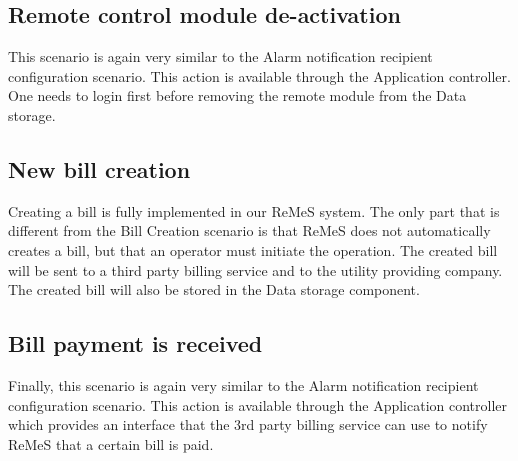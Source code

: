 \subsection{Remote control module de-activation}
This scenario is again very similar to the Alarm notification recipient configuration scenario. This action is available through the
Application controller. One needs to login first before removing the remote module from the Data storage.
\subsection{New bill creation}
Creating a bill is fully implemented in our ReMeS system. The only part that is different from the Bill Creation scenario is that ReMeS does
not automatically creates a bill, but that an operator must initiate the operation. The created bill will be sent to a third party billing
service and to the utility providing company. The created bill will also be stored in the Data storage component.
\subsection{Bill payment is received}
Finally, this scenario is again very similar to the Alarm notification recipient configuration scenario. This action is available through
the Application controller which provides an interface that the 3rd party billing service can use to notify ReMeS that a certain bill is
paid.
